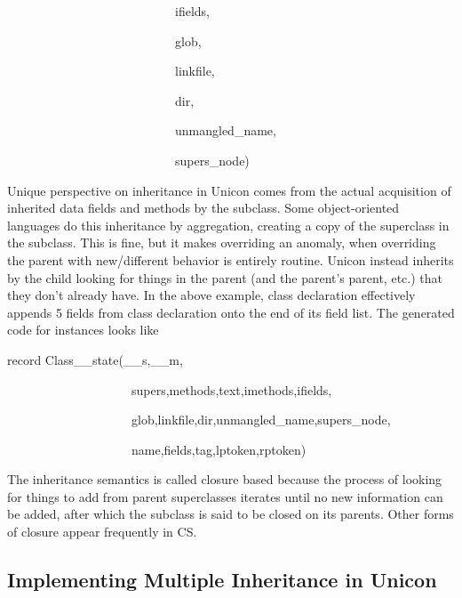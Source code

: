 {\ttfamily\mdseries
\ \ \ \ \ \ \ \ \ \ \ \ \ \ \ \ \ \ \ \ \ \ \ \ \ \ \ ifields,}

{\ttfamily\mdseries
\ \ \ \ \ \ \ \ \ \ \ \ \ \ \ \ \ \ \ \ \ \ \ \ \ \ \ glob,}

{\ttfamily\mdseries
\ \ \ \ \ \ \ \ \ \ \ \ \ \ \ \ \ \ \ \ \ \ \ \ \ \ \ linkfile,}

{\ttfamily\mdseries
\ \ \ \ \ \ \ \ \ \ \ \ \ \ \ \ \ \ \ \ \ \ \ \ \ \ \ dir,}

{\ttfamily\mdseries
\ \ \ \ \ \ \ \ \ \ \ \ \ \ \ \ \ \ \ \ \ \ \ \ \ \ \ unmangled\_name,}

{\ttfamily\mdseries
\ \ \ \ \ \ \ \ \ \ \ \ \ \ \ \ \ \ \ \ \ \ \ \ \ \ \ supers\_node)}


Unique perspective on inheritance in Unicon comes from the actual
acquisition of inherited data fields and methods by the subclass. Some
object-oriented languages do this inheritance {\textquotedbl}by
aggregation{\textquotedbl}, creating a copy of the superclass in the
subclass. This is fine, but it makes
{\textquotedbl}overriding{\textquotedbl} an anomaly, when overriding
the parent with new/different behavior is entirely routine. Unicon
instead inherits by the child looking for things in the parent (and
the parent's parent, etc.) that they don't already have. In the above
example, class declaration effectively appends 5 fields from class
declaration onto the end of its field list. The generated code for
instances looks like

{\ttfamily\mdseries
record Class\_\_state(\_\_s,\_\_m,}

{\ttfamily\mdseries
\ \ \ \ \ \ \ \ \ \ \ \ \ \ \ \ \ \ \ \ supers,methods,text,imethods,ifields,}

{\ttfamily\mdseries
\ \ \ \ \ \ \ \ \ \ \ \ \ \ \ \ \ \ \ \ glob,linkfile,dir,unmangled\_name,supers\_node,}

{\ttfamily\mdseries
\ \ \ \ \ \ \ \ \ \ \ \ \ \ \ \ \ \ \ \ name,fields,tag,lptoken,rptoken)}

The inheritance semantics is called {\textquotedbl}closure
based{\textquotedbl} because the process of looking for things to add
from parent superclasses iterates until no new information can be
added, after which the subclass is said to be closed on its
parents. Other forms of closure appear frequently in CS.

\subsection{Implementing Multiple Inheritance in Unicon }

